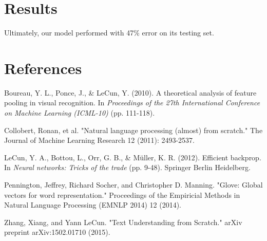 \documentclass{article}
\begin{document}
\section{Results}

Ultimately, our model performed with 47\% error on its testing set.

\section{References}

Boureau, Y. L., Ponce, J., \& LeCun, Y. (2010). A theoretical analysis of feature pooling in visual recognition. In \emph{Proceedings of the 27th International Conference on Machine Learning (ICML-10)} (pp. 111-118).

Collobert, Ronan, et al. "Natural language processing (almost) from scratch." The Journal of Machine Learning Research 12 (2011): 2493-2537.

LeCun, Y. A., Bottou, L., Orr, G. B., \& Müller, K. R. (2012). Efficient backprop. In \emph{Neural networks: Tricks of the trade} (pp. 9-48). Springer Berlin Heidelberg.

Pennington, Jeffrey, Richard Socher, and Christopher D. Manning. "Glove: Global vectors for word representation." Proceedings of the Empiricial Methods in Natural Language Processing (EMNLP 2014) 12 (2014).

Zhang, Xiang, and Yann LeCun. "Text Understanding from Scratch." arXiv preprint arXiv:1502.01710 (2015).
\end{document}
